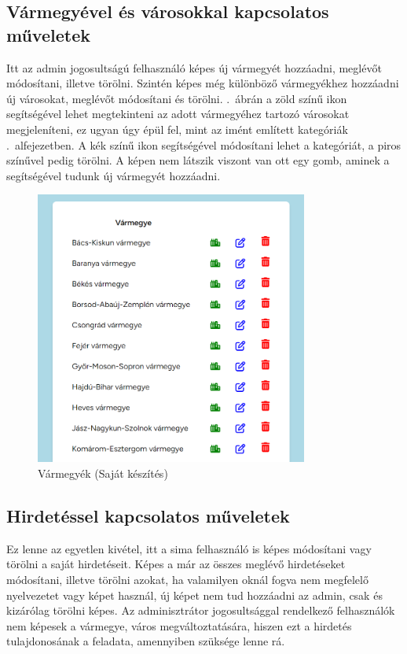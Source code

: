 \documentclass[]{thesis-ekf}
\theoremstyle{definition}
\theoremstyle{remark}
\begin{document}
	\subsection{Vármegyével és városokkal kapcsolatos műveletek}
		Itt az admin jogosultságú felhasználó képes új vármegyét hozzáadni, meglévőt módosítani, illetve törölni. Szintén képes még különböző vármegyékhez hozzáadni új városokat, meglévőt módosítani és törölni. .~ábrán a zöld színű ikon segítségével lehet megtekinteni az adott vármegyéhez tartozó városokat megjeleníteni, ez ugyan úgy épül fel, mint az imént említett kategóriák .~alfejezetben. A kék színű ikon segítségével módosítani lehet a kategóriát, a piros színűvel pedig törölni. A képen nem látszik viszont van ott egy gomb, aminek a segítségével tudunk új vármegyét hozzáadni.
		\begin{figure}[ht!]
			\centering
			\includegraphics[height=9cm]{./felhasznaloi/varmegye}
			\caption{Vármegyék (Saját készítés)} 
			\label{varmegye-varos-muvelet}
		\end{figure}
	\subsection{Hirdetéssel kapcsolatos műveletek}
		Ez lenne az egyetlen kivétel, itt a sima felhasználó is képes módosítani vagy törölni a saját hirdetéseit. Képes a már az összes meglévő hirdetéseket módosítani, illetve törölni azokat, ha valamilyen oknál fogva nem megfelelő nyelvezetet vagy képet használ, új képet nem tud hozzáadni az admin, csak és kizárólag törölni képes. Az adminisztrátor jogosultsággal rendelkező felhasználók nem képesek a vármegye, város megváltoztatására, hiszen ezt a hirdetés tulajdonosának a feladata, amennyiben szüksége lenne rá.
\end{document}
